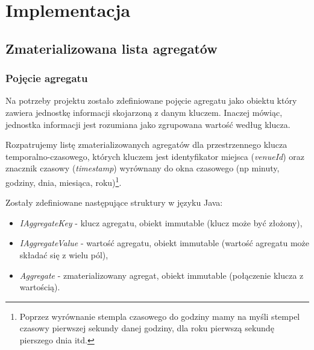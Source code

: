 \section{Implementacja}
\label{sec:impl}

\subsection{Zmaterializowana lista agregatów}
\subsubsection{Pojęcie agregatu}
\label{sec:impl-mal-aggregate}

Na potrzeby projektu zostało zdefiniowane pojęcie agregatu\cite{mal-lru-gorawski} jako obiektu który zawiera jednostkę informacji skojarzoną z danym kluczem. Inaczej mówiąc, jednostka informacji jest rozumiana jako zgrupowana wartość według klucza.

Rozpatrujemy listę zmaterializowanych agregatów dla przestrzennego klucza temporalno-czasowego, których kluczem jest identyfikator miejsca (\emph{venueId}) oraz znacznik czasowy (\emph{timestamp}) wyrównany do okna czasowego (np minuty, godziny, dnia, miesiąca, roku)\footnote{Poprzez wyrównanie stempla czasowego do godziny mamy na myśli stempel czasowy pierwszej sekundy danej godziny, dla roku pierwszą sekundę pierszego dnia itd.}.

Zostały zdefiniowane następujące struktury w języku Java:

\begin{itemize}[noitemsep]
  \item \emph{IAggregateKey} - klucz agregatu, obiekt immutable (klucz może być złożony),
  \item \emph{IAggregateValue} - wartość agregatu, obiekt immutable (wartość agregatu może składać się z wielu pól),
  \item \emph{Aggregate} - zmaterializowany agregat, obiekt immutable (połączenie klucza z wartością).
\end{itemize}







